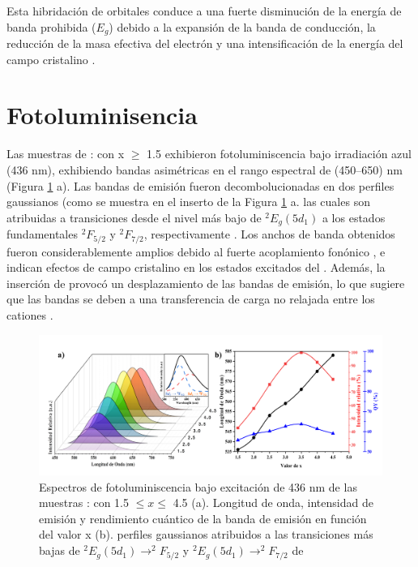Esta hibridación de orbitales conduce a una fuerte disminución de la energía de
banda prohibida ($E_g$) debido a la expansión de la banda de conducción, la
reducción de la masa efectiva del electrón y una intensificación de la energía
del campo cristalino \cite{Chen2015a}.\\

\section{Fotoluminisencia}

Las muestras de : con x $\geq $ 1.5
exhibieron fotoluminiscencia
bajo irradiación azul (436 nm), exhibiendo bandas asimétricas en el rango
espectral de (450–650) nm (Figura \ref{fig:foto} a). Las bandas de emisión fueron
decombolucionadas en dos perfiles gaussianos (como se muestra en el inserto de
la Figura \ref{fig:foto} a. las cuales son atribuidas a transiciones desde el
nivel más
bajo de $^2E_g(5d_1)$ a los estados fundamentales $^2F_{5/2}$ y $^2F_{7/2}$,
respectivamente \cite{Yu2014}. Los anchos de banda obtenidos fueron
considerablemente amplios debido
al
fuerte acoplamiento fonónico \cite{Ueda2019}, e indican efectos de campo
cristalino en los
estados excitados del  \cite{Miniscalco1978}. Además, la inserción
de 
provocó un
desplazamiento de las bandas de emisión, lo que sugiere que las bandas se deben
a una transferencia de carga no relajada entre los cationes 
\cite{Zhang2014}.\\

\begin{figure}[h]
    \centering%

    \includegraphics[width=\textwidth]{Kap4/Fotoluminisencia.png}%
    \caption{Espectros de fotoluminiscencia bajo excitación de 436 nm de las
    muestras : con 1.5 $\leq x \leq  $ 4.5
    (a). Longitud de onda, intensidad de emisión y rendimiento cuántico de la
    banda
    de emisión en función del valor x (b). perfiles gaussianos atribuidos a las
    transiciones más bajas de $^2E_g(5d_1)\rightarrow ^2F_{5/2}$ y $^2E_g(5d_1)
        \rightarrow ^2F_{7/2}$ de }\label{fig:foto}
\end{figure}

